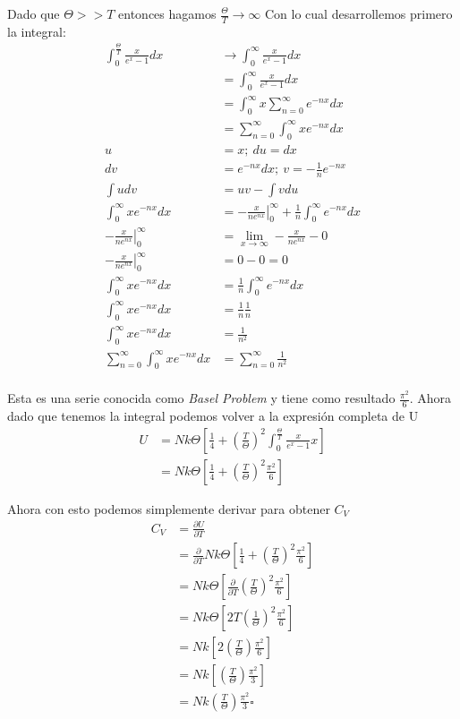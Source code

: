 \documentclass{report}
\begin{document}
Dado que $\Theta >> T$ entonces hagamos $\frac{\Theta}{T} \to \infty$ Con lo cual desarrollemos primero la integral:
\begin{align*}
	\int_{0}^{\frac{\Theta}{T}}\frac{x}{e^{x}- 1} dx &\to \int_{0}^{\infty}\frac{x}{e^{x}- 1} dx\\
	&= \int_{0}^{\infty}\frac{x}{e^{x}- 1} dx\\
	&= \int_{0}^{\infty} x \sum_{n= 0}^{\infty} e^{-nx} dx\\
	&= \sum_{n = 0}^{\infty} \int_{0}^{\infty}  x e^{-nx} dx\\
	u &= x;\ du = dx\\
	dv &= e^{-nx}dx;\ v = - \frac{1}{n} e^{-nx}\\
	\int udv &= uv -\int vdu\\
	\int_{0}^{\infty}  x e^{-nx} dx &= \left.- \frac{x}{n e^{nx}}\right|_0^\infty + \frac{1}{n} \int_0^\infty e^{-nx} dx\\
	\left.- \frac{x}{n e^{nx}}\right|_0^\infty &= \lim_{x \to \infty}- \frac{x}{n e^{nx}} - 0\\
	\left.- \frac{x}{n e^{nx}}\right|_0^\infty &= 0 - 0 = 0\\
	\int_{0}^{\infty}  x e^{-nx} dx &= \frac{1}{n} \int_0^\infty e^{-nx} dx\\
	\int_{0}^{\infty}  x e^{-nx} dx &= \frac{1}{n} \frac{1}{n}\\
	\int_{0}^{\infty}  x e^{-nx} dx &= \frac{1}{n^2}\\
	\sum_{n = 0}^{\infty} \int_{0}^{\infty}  x e^{-nx} dx &= \sum_{n = 0}^{\infty} \frac{1}{n^2}\\
\end{align*}

Esta es una serie conocida como \textit{Basel Problem} y tiene como resultado $\frac{\pi^2}{6}$. Ahora dado que tenemos
la integral podemos volver a la expresión completa de U
\begin{align*}
	U &=N k \Theta\left[\frac{1}{4} +\left(\frac{T}{\Theta}\right)^2 \int_{0}^{\frac{\Theta}{T}}\frac{x}{e^{x}- 1} x\right]\\
	&=N k \Theta\left[\frac{1}{4} +\left(\frac{T}{\Theta}\right)^2 \frac{\pi^2}{6} \right]
\end{align*}

Ahora con esto podemos simplemente derivar para obtener $C_V$
\begin{align*}
	C_V &= \frac{\partial U}{\partial T}\\
	&= \frac{\partial}{\partial T} N k \Theta\left[\frac{1}{4} +\left(\frac{T}{\Theta}\right)^2 \frac{\pi^2}{6} \right]\\
	&=  N k \Theta\left[\frac{\partial}{\partial T}\left(\frac{T}{\Theta}\right)^2 \frac{\pi^2}{6} \right]\\
	&=  N k \Theta\left[ 2 T\left(\frac{1}{\Theta}\right)^2 \frac{\pi^2}{6} \right]\\
	&=  N k \left[ 2 \left(\frac{T}{\Theta}\right) \frac{\pi^2}{6} \right]\\
	&=  N k \left[ \left(\frac{T}{\Theta}\right) \frac{\pi^2}{3} \right]\\
	&=  N k \left(\frac{T}{\Theta}\right) \frac{\pi^2}{3}\square\\
\end{align*}
\end{document}
